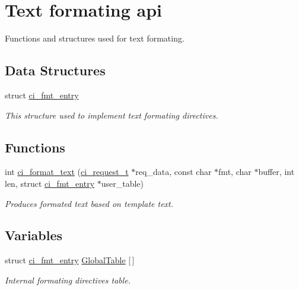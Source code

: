 \hypertarget{group__FORMATING}{
\section{Text formating api}
\label{group__FORMATING}
}


Functions and structures used for text formating.  
\subsection*{Data Structures}
\begin{DoxyCompactItemize}
\item 
struct \hyperlink{structci__fmt__entry}{ci\_\-fmt\_\-entry}
\begin{DoxyCompactList}\small\item\em This structure used to implement text formating directives. \item\end{DoxyCompactList}\end{DoxyCompactItemize}
\subsection*{Functions}
\begin{DoxyCompactItemize}
\item 
int \hyperlink{group__FORMATING_ga8978e54f481917484b64eb9c3d627a69}{ci\_\-format\_\-text} (\hyperlink{group__REQUEST_ga27da5c4ae491f527ce36901c2e78ea04}{ci\_\-request\_\-t} $\ast$req\_\-data, const char $\ast$fmt, char $\ast$buffer, int len, struct \hyperlink{structci__fmt__entry}{ci\_\-fmt\_\-entry} $\ast$user\_\-table)
\begin{DoxyCompactList}\small\item\em Produces formated text based on template text. \item\end{DoxyCompactList}\end{DoxyCompactItemize}
\subsection*{Variables}
\begin{DoxyCompactItemize}
\item 
struct \hyperlink{structci__fmt__entry}{ci\_\-fmt\_\-entry} \hyperlink{group__FORMATING_ga11b16bbcb255ccf2325bfdaa7eecb005}{GlobalTable} \mbox{[}$\,$\mbox{]}
\begin{DoxyCompactList}\small\item\em Internal formating directives table. \item\end{DoxyCompactList}\end{DoxyCompactItemize}


